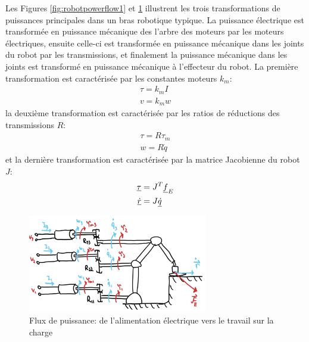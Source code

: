 Les Figures \ref{fig:robotpowerflow1} et \ref{fig:robotpowerflow2} illustrent les trois transformations de puissances principales dans un bras robotique typique. La puissance électrique est transformée en puissance mécanique des l'arbre des moteurs par les moteurs électriques, ensuite celle-ci est transformée en puissance mécanique dans les joints du robot par les transmissions, et finalement la puissance mécanique dans les joints est transformé en puissance mécanique à l'effecteur du robot. La première transformation est caractérisée par les constantes moteurs $k_m$:
\begin{align}
\tau = k_m I \\%
v = k_m w %
\end{align}
la deuxième transformation est caractérisée par les ratios de réductions des transmissions $R$:
\begin{align}
\tau = R \tau_m \\%
w = R \dot{q} %
\end{align}
et la dernière transformation est caractérisée par la matrice Jacobienne du robot $J$:
\begin{align}
\underline{\tau} &= J^T \underline{f}_E \\
\underline{\dot{r}} &= J \underline{\dot{q}}
\end{align}

\begin{figure}[H]
	\centering
		\includegraphics[width=0.70\textwidth]{fig/robotpowerflow2.jpg}
	\caption{Flux de puissance: de l'alimentation électrique vers le travail sur la charge}
	\label{fig:robotpowerflow2}
\end{figure}





